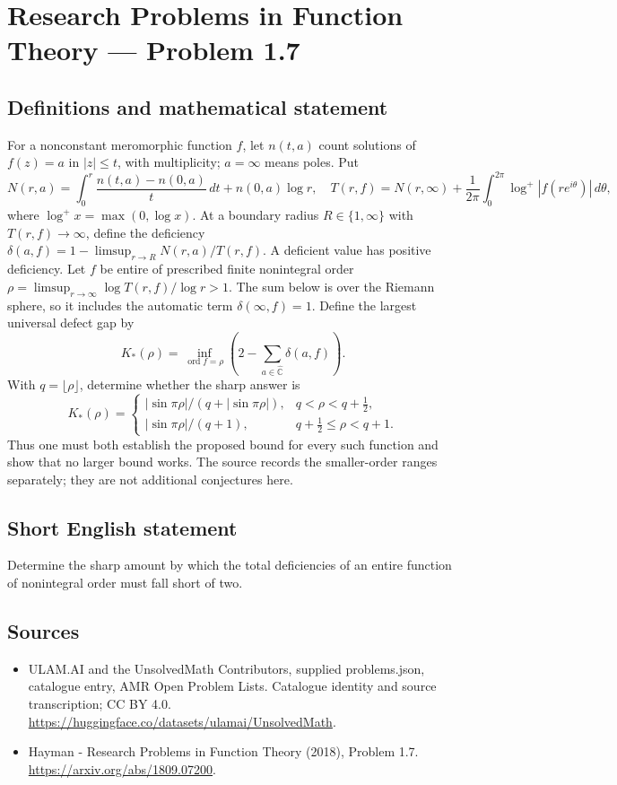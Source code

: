\documentclass[11pt,a4paper]{article}
\begin{document}
\section*{Research Problems in Function Theory — Problem 1.7}\label{statement}

\subsection{Definitions and mathematical statement}
For a nonconstant meromorphic function $f$, let $n(t,a)$ count solutions of $f(z)=a$ in $|z|\le t$, with multiplicity; $a=\infty$ means poles. Put
\[
N(r,a)=\int_0^r\frac{n(t,a)-n(0,a)}t\,dt+n(0,a)\log r,
\quad T(r,f)=N(r,\infty)+\frac1{2\pi}\int_0^{2\pi}\log^+|f(re^{i\theta})|\,d\theta,
\]
where $\log^+x=\max(0,\log x)$. At a boundary radius $R\in\{1,\infty\}$ with $T(r,f)\to\infty$, define the deficiency
$\delta(a,f)=1-\limsup_{r\to R}N(r,a)/T(r,f)$. A deficient value has positive deficiency.
Let $f$ be entire of prescribed finite nonintegral order
$\rho=\limsup_{r\to\infty}\log T(r,f)/\log r>1$.
The sum below is over the Riemann sphere, so it includes the automatic term $\delta(\infty,f)=1$. Define the largest universal defect gap by
\[
K_*(\rho)=\inf_{\operatorname{ord}f=\rho}\left(2-\sum_{a\in\widehat{\mathbb C}}\delta(a,f)\right).
\]
With $q=\lfloor\rho\rfloor$, determine whether the sharp answer is
\[
K_*(\rho)=
\begin{cases}
|\sin\pi\rho|/(q+|\sin\pi\rho|),&q<\rho<q+\tfrac12,\\
|\sin\pi\rho|/(q+1),&q+\tfrac12\le\rho<q+1.
\end{cases}
\]
Thus one must both establish the proposed bound for every such function and show that no larger bound works. The source records the smaller-order ranges separately; they are not additional conjectures here.
\subsection{Short English statement}
Determine the sharp amount by which the total deficiencies of an entire function of nonintegral order must fall short of two.
\subsection{Sources}
\begin{itemize}
\item[S1] ULAM.AI and the UnsolvedMath Contributors, supplied problems.json, catalogue entry, AMR Open Problem Lists. Catalogue identity and source transcription; CC BY 4.0.
\url{https://huggingface.co/datasets/ulamai/UnsolvedMath}.
\item[S2] Hayman - Research Problems in Function Theory (2018), Problem 1.7. 
\url{https://arxiv.org/abs/1809.07200}.
\end{itemize}
\end{document}

